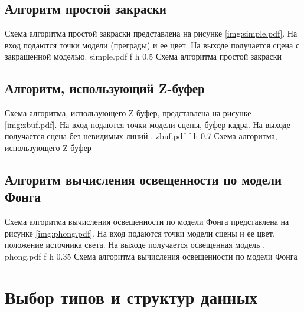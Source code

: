 \clearpage
	
\subsection{Алгоритм простой закраски}

Схема алгоритма простой закраски представлена на рисунке \ref{img:simple.pdf}.
На вход подаются точки модели (преграды) и ее цвет.
На выходе получается сцена с закрашенной моделью.
	{simple.pdf}
	{f}
	{h}
	{0.5\textwidth}
	{Схема алгоритма простой закраски}
	
\subsection{Алгоритм, использующий Z-буфер}

Схема алгоритма, использующего Z-буфер, представлена на рисунке \ref{img:zbuf.pdf}.
На вход подаются точки модели сцены, буфер кадра.
На выходе получается сцена без невидимых линий \cite{baseInvisible}.
	{zbuf.pdf}
	{f}
	{h}
	{0.7\textwidth}
	{Схема алгоритма, использующего Z-буфер}
	
\clearpage

\subsection{Алгоритм вычисления освещенности по модели Фонга}

Схема алгоритма вычисления освещенности по модели Фонга представлена на рисунке \ref{img:phong.pdf}.
На вход подаются точки модели сцены и ее цвет, положение источника света.
На выходе получается освещенная модель \cite{baseLight}.
	{phong.pdf}
	{f}
	{h}
	{0.35\textwidth}
	{Схема алгоритма вычисления освещенности по модели Фонга}
	
\section{Выбор типов и структур данных}

